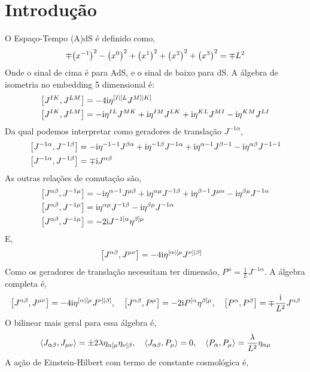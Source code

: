 \section{Introdução}

O Espaço-Tempo (A)dS é definido como, \[\mp\qty(x^{-1})^2-\qty(x^0)^2+\qty(x^1)^2+\qty(x^2)^2+\qty(x^3)^2=\mp L^2\] 
Onde o sinal de cima é para AdS, e o sinal de baixo para dS. A álgebra de isometria no embedding 5 dimensional é: 
\begin{align*}
    \comm{J^{IK}}{J^{LM}}&=-4\im\eta^{[I|[L}J^{M]|K]}\\
    \comm{J^{IK}}{J^{LM}}&=-\im\eta^{IL}J^{MK}+\im\eta^{IM}J^{LK}+\im\eta^{KL}J^{MI}-\im\eta^{KM}J^{LI}
\end{align*}
Da qual podemos interpretar como geradores de translação $J^{-1\alpha}$,
\begin{align*}
    \comm{J^{-1\alpha}}{J^{-1\beta}}&=-\im\eta^{-1-1}J^{\beta\alpha}+\im\eta^{-1\beta}J^{-1\alpha}+\im\eta^{\alpha-1}J^{\beta-1}-\im\eta^{\alpha\beta}J^{-1-1}\\
    \comm{J^{-1\alpha}}{J^{-1\beta}}&=\mp\im J^{\alpha\beta}
\end{align*}
As outras relações de comutação são,
\begin{align*}
    \comm{J^{\alpha\beta}}{J^{-1\mu}}&=-\im\eta^{\alpha-1}J^{\mu\beta}+\im\eta^{\alpha\mu}J^{-1\beta}+\im\eta^{\beta-1}J^{\mu\alpha}-\im\eta^{\beta\mu}J^{-1\alpha}\\
    \comm{J^{\alpha\beta}}{J^{-1\mu}}&=\im\eta^{\alpha\mu}J^{-1\beta}-\im\eta^{\beta\mu}J^{-1\alpha}\\
    \comm{J^{\alpha\beta}}{J^{-1\mu}}&=-2\im J^{-1[\alpha}\eta^{\beta]\mu}
\end{align*}
E,
\begin{align*}
    \comm{J^{\alpha\beta}}{J^{\mu\nu}}&=-4\im\eta^{[\alpha|[\mu}J^{\nu]|\beta]}
\end{align*}
Como os geradores de translação necessitam ter dimensão, $P^\alpha=\frac1LJ^{-1\alpha}$. A álgebra completa é,
\[\comm{J^{\alpha\beta}}{J^{\mu\nu}}=-4\im\eta^{[\alpha|[\mu}J^{\nu]|\beta]},\ \ \ \comm{J^{\alpha\beta}}{P^\mu}=-2\im P^{[\alpha}\eta^{\beta]\mu},\ \ \ \comm{P^{\alpha}}{P^{\beta}}=\mp\frac{\im}{L^2} J^{\alpha\beta}\]
O bilinear mais geral para essa álgebra é,
\[\expval{J_{\alpha\beta},J_{\mu\nu}}=\pm2\lambda\eta_{\alpha[\mu}\eta_{\nu]\beta},\ \ \ \expval{J_{\alpha\beta},P_\mu}=0,\ \ \ \expval{P_\alpha,P_\mu}=\frac{\lambda}{L^2}\eta_{\alpha\mu}\]
A ação de Einstein-Hilbert com termo de constante cosmológica é,
